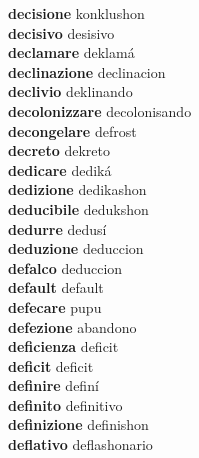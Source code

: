 \textbf{decisione } konklushon \\
\textbf{decisivo } desisivo \\
\textbf{declamare } deklamá \\
\textbf{declinazione } declinacion \\
\textbf{declivio } deklinando \\
\textbf{decolonizzare } decolonisando \\
\textbf{decongelare } defrost \\
\textbf{decreto } dekreto \\
\textbf{dedicare } dediká \\
\textbf{dedizione } dedikashon \\
\textbf{deducibile } dedukshon \\
\textbf{dedurre } dedusí \\
\textbf{deduzione } deduccion \\
\textbf{defalco } deduccion \\
\textbf{default } default \\
\textbf{defecare } pupu \\
\textbf{defezione } abandono \\
\textbf{deficienza } deficit \\
\textbf{deficit } deficit \\
\textbf{definire } definí \\
\textbf{definito } definitivo \\
\textbf{definizione } definishon \\
\textbf{deflativo } deflashonario \\
